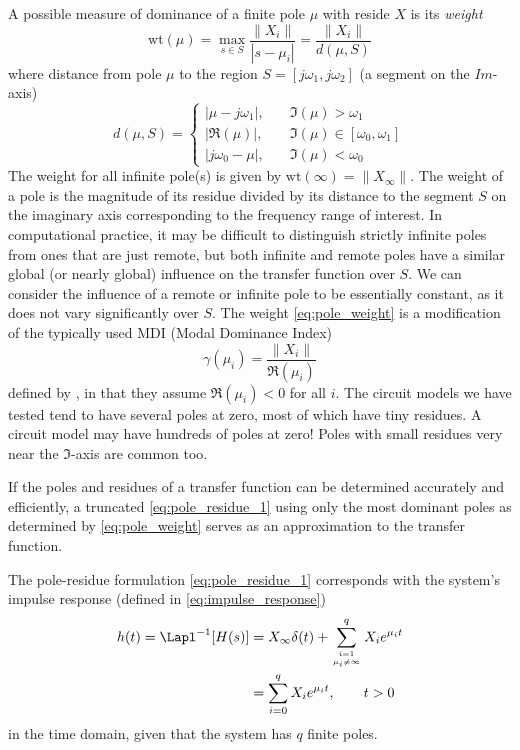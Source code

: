 A possible measure of dominance of a finite pole $\mu$ with reside $X$ is its \emph{weight}
\begin{equation}
\text{wt}(\mu) = 
\max_{s\in S} \frac{\|X_i\|}{|s-\mu_i|} =   \frac{\|X_i\|}{d(\mu,S)}
\label{eq:pole_weight} 
\end{equation}
where distance from pole $\mu$ to the region $S=[j\omega_1, j\omega_2]$ (a segment on the $Im$-axis)  
\begin{equation*}
d(\mu,S)=
\begin{cases}
|\mu-j\omega_1|, & \quad \Im (\mu) >\omega_1\\	
|\Re (\mu)|, & \quad  \Im (\mu) \in [\omega_0,\omega_1] \\ 
|j\omega_0-\mu|, & \quad  \Im (\mu) <\omega_0
\end{cases}
\end{equation*}
The weight for all infinite pole(s) is given by $\text{wt}(\infty) = \|X_\infty\|$.  The weight of a pole is the magnitude of its residue divided by its distance to the segment $S$ on the imaginary axis  corresponding to  the frequency range of interest. In computational practice, it may be difficult to distinguish  strictly infinite poles from ones that are just remote, but both infinite and remote poles have a similar global (or nearly global) influence on the transfer function over $S$.  We can consider the influence of a remote or infinite pole to be essentially constant, as it does not vary significantly over $S$.   
The weight \eqref{eq:pole_weight} is a modification of the typically used MDI (Modal Dominance Index) 
\begin{equation}
\gamma(\mu_i) = \frac{\| X_i \|}{\Re (\mu_i )}
\label{eq:MDI1} 
\end{equation}
defined by \cite{Aguirre}, in that they assume $\Re(\mu_i)<0$ for all $i$.     The circuit models we have tested tend to have several poles at zero, most of which have tiny residues.  A circuit model may have hundreds of poles at zero!  Poles with small residues very near the $\Im$-axis are common too.         

If the poles and residues of a transfer function can be determined accurately and efficiently,  a truncated \eqref{eq:pole_residue_1} using only the most dominant poles as determined by \eqref{eq:pole_weight}  serves as an approximation to the transfer function.  
 
The pole-residue formulation \eqref{eq:pole_residue_1} corresponds with the system's impulse response (defined in \eqref{eq:impulse_response})
\begin{align}
          h(t) = \Lapl^{-1}[H(s)] &=
         X_\infty \delta(t) + \sum_{i=1\atop{\mu_i\neq\infty}}^q  X_i e^{\mu_i t}\\
 &= \sum_{i=0}^q  X_i e^{\mu_i t}, \qquad t>0 \nonumber
\label{eq:impulse_response_pole_exp}
\end{align}
in the time domain, given that the system has $q$ finite poles.  

